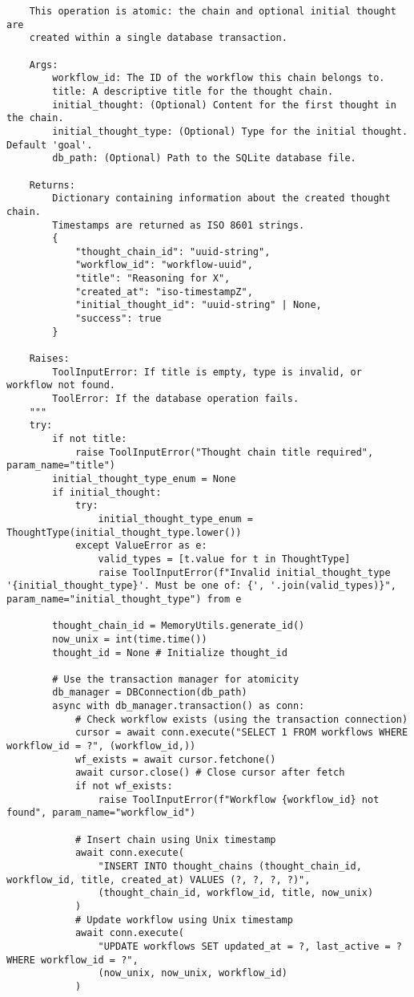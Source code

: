 \documentclass[12pt,a4paper]{article}
\begin{document}
\begin{pageablecode}
\begin{verbatim}
    This operation is atomic: the chain and optional initial thought are
    created within a single database transaction.

    Args:
        workflow_id: The ID of the workflow this chain belongs to.
        title: A descriptive title for the thought chain.
        initial_thought: (Optional) Content for the first thought in the chain.
        initial_thought_type: (Optional) Type for the initial thought. Default 'goal'.
        db_path: (Optional) Path to the SQLite database file.

    Returns:
        Dictionary containing information about the created thought chain.
        Timestamps are returned as ISO 8601 strings.
        {
            "thought_chain_id": "uuid-string",
            "workflow_id": "workflow-uuid",
            "title": "Reasoning for X",
            "created_at": "iso-timestampZ",
            "initial_thought_id": "uuid-string" | None,
            "success": true
        }

    Raises:
        ToolInputError: If title is empty, type is invalid, or workflow not found.
        ToolError: If the database operation fails.
    """
    try:
        if not title:
            raise ToolInputError("Thought chain title required", param_name="title")
        initial_thought_type_enum = None
        if initial_thought:
            try:
                initial_thought_type_enum = ThoughtType(initial_thought_type.lower())
            except ValueError as e:
                valid_types = [t.value for t in ThoughtType]
                raise ToolInputError(f"Invalid initial_thought_type '{initial_thought_type}'. Must be one of: {', '.join(valid_types)}", param_name="initial_thought_type") from e

        thought_chain_id = MemoryUtils.generate_id()
        now_unix = int(time.time())
        thought_id = None # Initialize thought_id

        # Use the transaction manager for atomicity
        db_manager = DBConnection(db_path)
        async with db_manager.transaction() as conn:
            # Check workflow exists (using the transaction connection)
            cursor = await conn.execute("SELECT 1 FROM workflows WHERE workflow_id = ?", (workflow_id,))
            wf_exists = await cursor.fetchone()
            await cursor.close() # Close cursor after fetch
            if not wf_exists:
                raise ToolInputError(f"Workflow {workflow_id} not found", param_name="workflow_id")

            # Insert chain using Unix timestamp
            await conn.execute(
                "INSERT INTO thought_chains (thought_chain_id, workflow_id, title, created_at) VALUES (?, ?, ?, ?)",
                (thought_chain_id, workflow_id, title, now_unix)
            )
            # Update workflow using Unix timestamp
            await conn.execute(
                "UPDATE workflows SET updated_at = ?, last_active = ? WHERE workflow_id = ?",
                (now_unix, now_unix, workflow_id)
            )


\end{verbatim}
\end{pageablecode}
\end{document}
